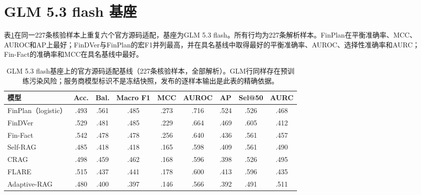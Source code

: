 \documentclass[12pt,openany]{ctexbook}
\begin{document}
\section{GLM 5.3 flash 基座}
\label{app:glm}
表\ref{tab:glm-zh}在同一227条核验样本上重复六个官方源码适配，基座为GLM 5.3 flash。所有行均为227条解析样本。FinPlan在平衡准确率、MCC、AUROC和AP上最好；FinDVer与FinPlan的宏F1并列最高，并在具名基线中取得最好的平衡准确率、AUROC、选择性准确率和AURC；Fin-Fact的准确率和MCC在具名基线中最好。\par
\begin{table}[htbp]
\centering
\caption{GLM 5.3 flash基座上的官方源码适配基线（227条核验样本，全部解析）。GLM行同样存在预训练污染风险；服务商模型标识不是冻结快照，发布的逐样本输出是此表的精确依据。}
\label{tab:glm-zh}
\setlength{\tabcolsep}{2pt}
\begin{tabular}{lcccccccc}
\toprule
模型 & Acc. & Bal. & Macro F1 & MCC & AUROC & AP & Sel@50 & AURC \\
\midrule
FinPlan（logistic） & .493 & .561 & .485 & .273 & .716 & .524 & .526 & .468 \\
FinDVer & .529 & .481 & .485 & .229 & .664 & .469 & .605 & .412 \\
Fin-Fact & .542 & .478 & .478 & .256 & .640 & .436 & .561 & .457 \\
Self-RAG & .485 & .418 & .418 & .165 & .598 & .409 & .561 & .490 \\
CRAG & .498 & .459 & .462 & .168 & .596 & .398 & .526 & .495 \\
FLARE & .515 & .437 & .441 & .178 & .600 & .413 & .596 & .435 \\
Adaptive-RAG & .480 & .400 & .397 & .146 & .566 & .392 & .491 & .511 \\
\bottomrule
\end{tabular}
\end{table}
\end{document}
